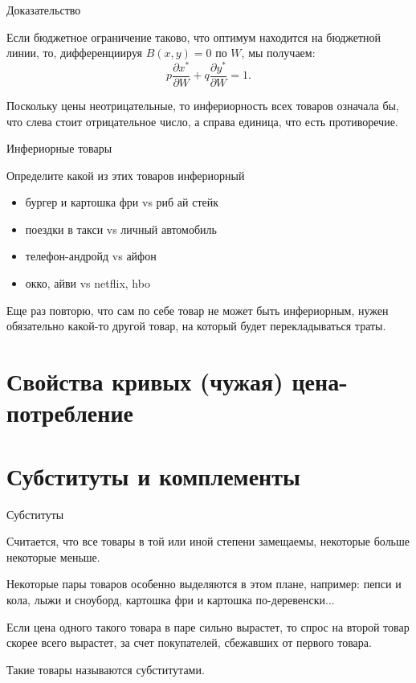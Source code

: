 \documentclass{beamer}
\begin{document}
\begin{frame}{Доказательство}

Если бюджетное ограничение таково, что оптимум находится на бюджетной линии, то, дифференциируя $B(x,y)= 0$ по $W$, мы получаем: 
$$ p \frac{\partial x^{\ast}}{\partial W}  + q \frac{\partial y^{\ast}}{\partial W}  = 1.$$ 

Поскольку цены неотрицательные, то инфериорность всех товаров означала бы, что слева стоит отрицательное число, а справа единица, что есть противоречие.

\end{frame}

\begin{frame}{Инфериорные товары}

Определите какой из этих товаров инфериорный

\begin{itemize}
  \item бургер и картошка фри vs риб ай стейк
  \item поездки в такси vs личный автомобиль
  \item телефон-андройд vs айфон
  \item окко, айви vs netflix, hbo
\end{itemize}

Еще раз повторю, что сам по себе товар не может быть инфериорным, нужен обязательно какой-то другой товар, на который будет перекладываться траты. 

\end{frame}
\section{Свойства кривых (чужая) цена-потребление}
\section{Субституты и комплементы}

\begin{frame}{Субституты}

Считается, что \alert{все товары в той или иной степени замещаемы}, некоторые больше некоторые меньше. 

Некоторые пары товаров особенно выделяются в этом плане, например: пепси и кола, лыжи и сноуборд, картошка фри и картошка по-деревенски... 

Если цена одного такого товара в паре сильно вырастет, то спрос на второй товар скорее всего вырастет, за счет покупателей, сбежавших от первого товара.

Такие товары называются субститутами.

\end{frame}
\end{document}
